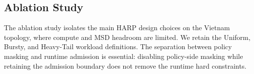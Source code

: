 \documentclass[final,5p]{elsarticle}
\newcommand{\rev}[1]{\textcolor{BrickRed}{#1}}
\begin{document}
\subsection{Ablation Study}
\label{subsec:ablation_study}

The ablation study isolates the main HARP design choices on the Vietnam topology, where compute and MSD headroom are limited. \rev{\rev{We retain the Uniform, Bursty, and Heavy-Tail workload definitions.} The separation between policy masking and runtime admission is essential: disabling policy-side masking while retaining the admission boundary does not remove the runtime hard constraints.}

\begin{table}[!tb]
\centering
\caption{\rev{Ablation results on the Vietnam topology (mean$^{\pm SD}$ across $N=20$ matched simulation runs; fixed HARP checkpoint).}}
\label{tab:vietnam_ablation_summary}
\renewcommand{\arraystretch}{1.12}
\setlength{\tabcolsep}{2pt}
\small
{}
\end{table}
\end{document}
